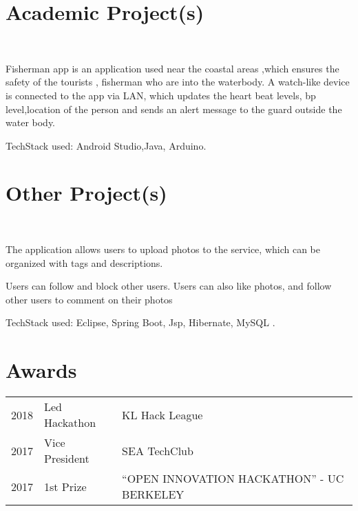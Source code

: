 \documentclass[]{deedy-resume-openfont}
\begin{document}
\begin{minipage}[t]{0.66\textwidth}

\section{Academic Project(s)}
\\
\begin{tightemize}
\item Fisherman app is an application used near the coastal areas ,which ensures the safety of the tourists , fisherman who are into the waterbody. A watch-like device is connected to the app via LAN, which updates the heart beat levels, bp level,location of the person and sends an alert message to the guard outside the water body. 
\item TechStack used: Android Studio,Java, Arduino.
\end{tightemize}
\sectionsep

\section{Other Project(s)}
\\
\begin{tightemize}
\item The application allows users to upload photos to the service, which can be organized with tags and descriptions.
\item Users can follow and block other users. Users can also like photos, and follow other users to comment on their photos
\item TechStack used: Eclipse, Spring Boot, Jsp, Hibernate, MySQL .
\end{tightemize}
\sectionsep


\section{Awards} 
\begin{tabular}{rll}
2018	     & Led Hackathon  & KL Hack League\\
2017	     & Vice President  & SEA TechClub\\
2017     & 1st Prize & “OPEN INNOVATION HACKATHON” - UC BERKELEY\\
\end{tabular}
\sectionsep

\nocite{*}

\end{minipage} 
\end{document}
